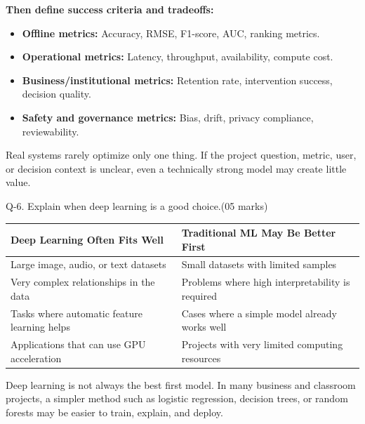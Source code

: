 \documentclass[11pt,a4paper]{article}
\newcommand{\question}[2]{%
  \begin{qbox}#1\hfill\textcolor{accent}{(05 marks)}\\[2pt]#2\end{qbox}%
}
\begin{document}
\textbf{Then define success criteria and tradeoffs:}
\begin{itemize}[leftmargin=*,topsep=2pt]
  \item \textbf{Offline metrics:} Accuracy, RMSE, F1-score, AUC, ranking metrics.
  \item \textbf{Operational metrics:} Latency, throughput, availability, compute cost.
  \item \textbf{Business/institutional metrics:} Retention rate, intervention success, decision quality.
  \item \textbf{Safety and governance metrics:} Bias, drift, privacy compliance, reviewability.
\end{itemize}

\begin{conceptbox}
Real systems rarely optimize only one thing. If the project question, metric, user, or decision context is unclear, even a technically strong model may create little value.
\end{conceptbox}

\question{Q-6. Explain when deep learning is a good choice.}{}

\begin{center}
\begin{tabular}{@{}p{6.5cm}p{6.5cm}@{}}
\toprule
\rowcolor{primary!15}
\textbf{Deep Learning Often Fits Well} & \textbf{Traditional ML May Be Better First} \\
\midrule
Large image, audio, or text datasets & Small datasets with limited samples \\
Very complex relationships in the data & Problems where high interpretability is required \\
Tasks where automatic feature learning helps & Cases where a simple model already works well \\
Applications that can use GPU acceleration & Projects with very limited computing resources \\
\bottomrule
\end{tabular}
\end{center}

\begin{conceptbox}
Deep learning is not always the best first model. In many business and classroom projects, a simpler method such as logistic regression, decision trees, or random forests may be easier to train, explain, and deploy.
\end{conceptbox}
\end{document}
